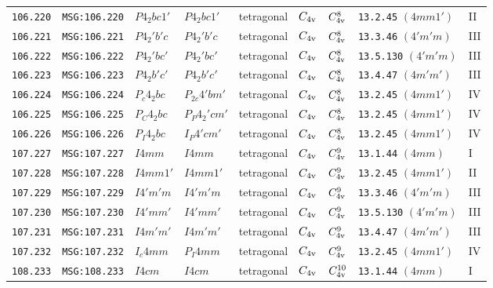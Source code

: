 \documentclass[fleqn,10pt]{jsarticle}
\begin{document}
\begin{center}
\begin{longtable}{lllllllll}
\texttt{106.220} & \texttt{MSG:106.220} & $P4_{2}bc1'$ & $P4_{2}bc1'$ & tetragonal & $C_{\rm 4v}$ & $C_{\rm 4v}^{8}$ & \texttt{13.2.45} $(4mm1')$ & II \\
\texttt{106.221} & \texttt{MSG:106.221} & $P4_{2}'b'c$ & $P4_{2}'b'c$ & tetragonal & $C_{\rm 4v}$ & $C_{\rm 4v}^{8}$ & \texttt{13.3.46} $(4'm'm)$ & III \\
\texttt{106.222} & \texttt{MSG:106.222} & $P4_{2}'bc'$ & $P4_{2}'bc'$ & tetragonal & $C_{\rm 4v}$ & $C_{\rm 4v}^{8}$ & \texttt{13.5.130} $(4'm'm)$ & III \\
\texttt{106.223} & \texttt{MSG:106.223} & $P4_{2}b'c'$ & $P4_{2}b'c'$ & tetragonal & $C_{\rm 4v}$ & $C_{\rm 4v}^{8}$ & \texttt{13.4.47} $(4m'm')$ & III \\
\texttt{106.224} & \texttt{MSG:106.224} & $P_{c}4_{2}bc$ & $P_{2c}4'bm'$ & tetragonal & $C_{\rm 4v}$ & $C_{\rm 4v}^{8}$ & \texttt{13.2.45} $(4mm1')$ & IV \\
\texttt{106.225} & \texttt{MSG:106.225} & $P_{C}4_{2}bc$ & $P_{P}4_{2}'cm'$ & tetragonal & $C_{\rm 4v}$ & $C_{\rm 4v}^{8}$ & \texttt{13.2.45} $(4mm1')$ & IV \\
\texttt{106.226} & \texttt{MSG:106.226} & $P_{I}4_{2}bc$ & $I_{P}4'cm'$ & tetragonal & $C_{\rm 4v}$ & $C_{\rm 4v}^{8}$ & \texttt{13.2.45} $(4mm1')$ & IV \\ \hline
\texttt{107.227} & \texttt{MSG:107.227} & $I4mm$ & $I4mm$ & tetragonal & $C_{\rm 4v}$ & $C_{\rm 4v}^{9}$ & \texttt{13.1.44} $(4mm)$ & I \\
\texttt{107.228} & \texttt{MSG:107.228} & $I4mm1'$ & $I4mm1'$ & tetragonal & $C_{\rm 4v}$ & $C_{\rm 4v}^{9}$ & \texttt{13.2.45} $(4mm1')$ & II \\
\texttt{107.229} & \texttt{MSG:107.229} & $I4'm'm$ & $I4'm'm$ & tetragonal & $C_{\rm 4v}$ & $C_{\rm 4v}^{9}$ & \texttt{13.3.46} $(4'm'm)$ & III \\
\texttt{107.230} & \texttt{MSG:107.230} & $I4'mm'$ & $I4'mm'$ & tetragonal & $C_{\rm 4v}$ & $C_{\rm 4v}^{9}$ & \texttt{13.5.130} $(4'm'm)$ & III \\
\texttt{107.231} & \texttt{MSG:107.231} & $I4m'm'$ & $I4m'm'$ & tetragonal & $C_{\rm 4v}$ & $C_{\rm 4v}^{9}$ & \texttt{13.4.47} $(4m'm')$ & III \\
\texttt{107.232} & \texttt{MSG:107.232} & $I_{c}4mm$ & $P_{I}4mm$ & tetragonal & $C_{\rm 4v}$ & $C_{\rm 4v}^{9}$ & \texttt{13.2.45} $(4mm1')$ & IV \\ \hline
\texttt{108.233} & \texttt{MSG:108.233} & $I4cm$ & $I4cm$ & tetragonal & $C_{\rm 4v}$ & $C_{\rm 4v}^{10}$ & \texttt{13.1.44} $(4mm)$ & I \\

\end{longtable}
\end{center}
\end{document}
